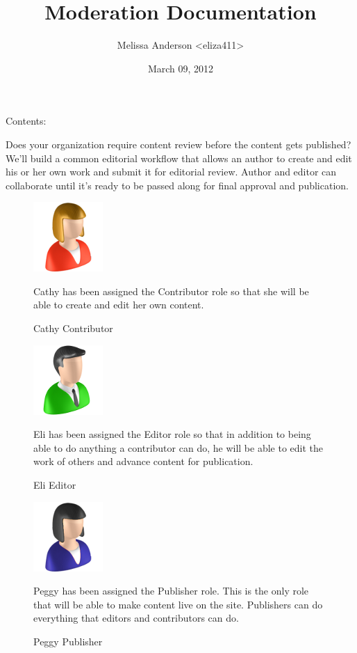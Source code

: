 \documentclass[letterpaper,10pt,english]{sphinxmanual}
\title{Moderation Documentation}
\date{March 09, 2012}
\author{Melissa Anderson \textless{}eliza411\textgreater{}}
\begin{document}
\maketitle
\tableofcontents
{}\label{index::doc}


Contents:

Does your organization require content review before the content gets published? We'll build a common editorial workflow that allows an author to create and edit his or her own work and submit it for editorial review. Author and editor can collaborate until it's ready to be passed along for final approval and publication.
\begin{figure}[htbp]
\centering
\capstart

\includegraphics{sites/default/files/recipes/user_icons/contributor.png}
\caption{Cathy Contributor}{\small 
Cathy has been assigned the Contributor role so that she will be able to create and edit her own content.
}\end{figure}
\begin{figure}[htbp]
\centering
\capstart

\includegraphics{sites/default/files/recipes/user_icons/editor.png}
\caption{Eli Editor}{\small 
Eli has been assigned the Editor role so that in addition to being able to do anything a contributor can do, he will be able to edit the work of others and advance content for publication.
}\end{figure}
\begin{figure}[htbp]
\centering
\capstart

\includegraphics{sites/default/files/recipes/user_icons/publisher.png}
\caption{Peggy Publisher}{\small 
Peggy has been assigned the Publisher role. This is the only role that will be able to make content live on the site. Publishers can do everything that editors and contributors can do.
}\end{figure}
\end{document}
